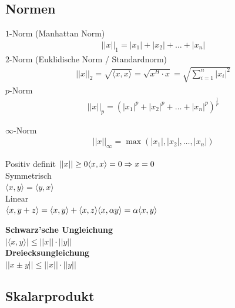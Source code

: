 \documentclass[a4paper,twocolumn]{article}
\begin{document}
\subsection{Normen}
		\begin{fdef}[Norm]
			$1$-Norm (Manhattan Norm)
			\begin{align*}
				||x||_1=  |x_1| + |x_2| + \hdots + |x_n|
			\end{align*}
			$2$-Norm (Euklidische Norm / Standardnorm)
			\begin{align*}
				||x||_2= \sqrt{\langle x,x \rangle} = \sqrt{x^H\cdot x} = \sqrt{\sum_{i=1}^{n}|x_i|^2} 	
			\end{align*}
			$p$-Norm
			\begin{align*}
				||x||_p= \left( |x_1|^p + |x_2|^p + \hdots + |x_n|^p \right) ^{\frac{1}{p}} 
			\end{align*}

			$\infty$-Norm
			\begin{align*}
				||x||_{\infty} = \max ( |x_1|, |x_2|, \hdots, |x_n|)
			\end{align*}

		\end{fdef}
	
		\begin{feig}
			Positiv definit
				$
					||x|| \ge 0 \\
					\langle x, x \rangle = 0 \Rightarrow x = 0
				$\\
			Symmetrisch\\
				$
					\langle x , y \rangle = \langle y, x \rangle
				$\\
			Linear\\
				$
					\langle x, y + z \rangle = \langle x, y \rangle + \langle x, z\rangle \\
					\langle x, \alpha y \rangle = \alpha \langle x, y \rangle
				$
		\end{feig}

		\begin{fmerke}
			\textbf{Schwarz'sche Ungleichung}\\[.5mm]
				$|\langle x,y \rangle| \le ||x|| \cdot ||y||$\\[2.5mm]
			\textbf{Dreiecksungleichung}\\[.5mm]
				$||x \pm y|| \le ||x|| \cdot ||y||$\\[-2mm]
		\end{fmerke}
		
	\subsection{Skalarprodukt}
	
\end{document}
